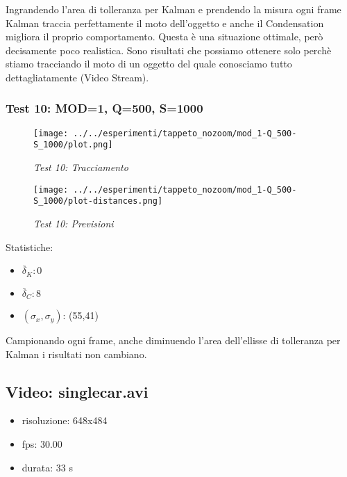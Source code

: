 Ingrandendo l'area di tolleranza per Kalman e prendendo la misura ogni frame Kalman traccia perfettamente il moto dell'oggetto e anche il Condensation migliora il proprio comportamento. Questa è una situazione ottimale, però decisamente poco realistica. Sono risultati che possiamo ottenere solo perchè stiamo tracciando il moto di un oggetto del quale conosciamo tutto dettagliatamente (Video Stream).

\newpage
\subsubsection{Test 10: MOD=1, Q=500, S=1000}

\begin{figure}[hb]
\centering
\texttt{[image: ../../esperimenti/tappeto\_nozoom/mod\_1-Q\_500-S\_1000/plot.png]}
\caption{\textit{Test 10: Tracciamento}}
\end{figure}

\begin{figure}[hb]
\centering
\texttt{[image: ../../esperimenti/tappeto\_nozoom/mod\_1-Q\_500-S\_1000/plot-distances.png]}
\caption{\textit{Test 10: Previsioni}}
\end{figure}

Statistiche:
\begin{itemize}
\item \begin{math} \bar \delta_K: 0 \end{math}
\item \begin{math} \bar \delta_C: 8 \end{math}
\item \begin{math}(\sigma_x,\sigma_y)\end{math}: (55,41)
\end{itemize}

Campionando ogni frame, anche diminuendo l'area dell'ellisse di tolleranza per Kalman i risultati non cambiano.

\newpage
\subsection{Video: singlecar.avi}

\begin{itemize}
\item risoluzione: 648x484
\item fps: 30.00
\item durata: 33 s
\end{itemize}

